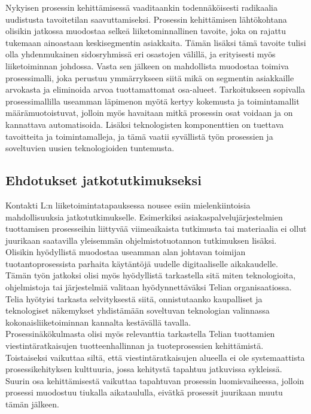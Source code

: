 \documentclass[finnish,12pt,a4paper,pdftex]{article}
\begin{document}
Nykyisen prosessin kehittämisessä vaaditaankin todennäköisesti radikaalia uudistusta tavoitetilan saavuttamiseksi. Prosessin kehittämisen lähtökohtana olisikin jatkossa muodostaa selkeä liiketominnallinen tavoite, joka on rajattu tukemaan ainoastaan keskisegmentin asiakkaita. Tämän lisäksi tämä tavoite tulisi olla yhdenmukainen sidosryhmissä eri osastojen välillä, ja erityisesti myös liiketoiminnan johdossa. Vasta sen jälkeen on mahdollista muodostaa toimiva prosessimalli, joka perustuu ymmärrykseen siitä mikä on segmentin asiakkaille arvokasta ja eliminoida arvoa tuottamattomat osa-alueet. Tarkoitukseen sopivalla prosessimallilla useamman läpimenon myötä kertyy kokemusta ja toimintamallit määrämuotoistuvat, jolloin myös havaitaan mitkä prosessin osat voidaan ja on kannattava automatisoida. Lisäksi teknologisten komponenttien on tuettava tavoitteita ja toimintamalleja, ja tämä vaatii syvällistä työn prosessien ja soveltuvien uusien teknologioiden tuntemusta. 

\subsection{Ehdotukset jatkotutkimukseksi}

Kontakti L:n liiketoimintatapauksessa nousee esiin mielenkiintoisia mahdollisuuksia jatkotutkimukselle. Esimerkiksi asiakaspalvelujärjestelmien tuottamisen prosesseihin liittyvää viimeaikaista tutkimusta tai materiaalia ei ollut juurikaan saatavilla yleisemmän ohjelmistotuotannon tutkimuksen lisäksi. Olisikin hyödyllistä muodostaa useamman alan johtavan toimijan tuotantoprosessista parhaita käytäntöjä uudelle digitaaliselle aikakaudelle.\\

\noindent Tämän työn jatkoksi olisi myös hyödyllistä tarkastella sitä miten teknologioita, ohjelmistoja tai järjestelmiä valitaan hyödynnettäväksi Telian organisaatiossa. Telia hyötyisi tarkasta selvityksestä siitä, onnistutaanko kaupalliset ja teknologiset näkemykset yhdistämään soveltuvan teknologian valinnassa kokonaisliiketoiminnan kannalta kestävällä tavalla.\\

\noindent Prosessinäkökulmasta olisi myös relevanttia tarkastella Telian tuottamien viestintäratkaisujen tuotteenhallinnan ja tuoteprosessien kehittämistä. Toistaiseksi vaikuttaa siltä, että viestintäratkaisujen alueella ei ole systemaattista prosessikehityksen kulttuuria, jossa kehitystä tapahtuu jatkuvissa sykleissä. Suurin osa kehittämisestä vaikuttaa tapahtuvan prosessin luomisvaiheessa, jolloin prosessi muodostuu tiukalla aikataululla, eivätkä prosessit juurikaan muutu tämän jälkeen.\\
\end{document}
